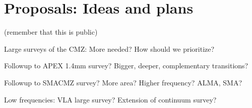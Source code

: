 \section{Proposals: Ideas and plans}
(remember that this is public)

Large surveys of the CMZ: More needed?  How should we prioritize?

Followup to APEX 1.4mm survey?  Bigger, deeper, complementary transitions?

Followup to SMACMZ survey?  More area?  Higher frequency?  ALMA, SMA?

Low frequencies: VLA large survey?  Extension of \citet{Law2008b} continuum survey?